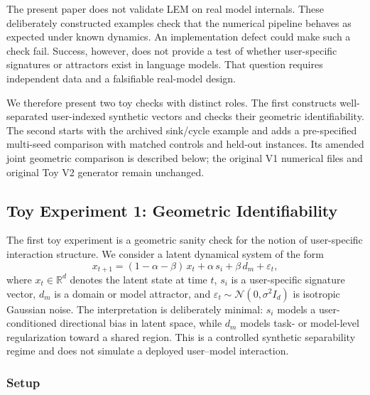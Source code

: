 \documentclass[11pt]{article}
\begin{document}
The present paper does not validate LEM on real model internals. These deliberately
constructed examples check that the numerical pipeline behaves as expected under
known dynamics. An implementation defect could make such a check fail. Success,
however, does not provide a test of whether user-specific signatures or attractors
exist in language models. That question requires independent data and a falsifiable
real-model design.

We therefore present two toy checks with distinct roles. The first constructs
well-separated user-indexed synthetic vectors and checks their geometric
identifiability. The second starts with the archived sink/cycle example and
adds a pre-specified multi-seed comparison with matched controls and held-out
instances. Its amended joint geometric comparison is described below; the
original V1 numerical files and original Toy V2 generator remain unchanged.

\subsection{Toy Experiment 1: Geometric Identifiability}

The first toy experiment is a geometric sanity check for the notion of
user-specific interaction structure. We consider a latent dynamical system of the
form
\begin{equation}
  x_{t+1} = (1 - \alpha - \beta)\, x_t + \alpha\, s_i + \beta\, d_m + \varepsilon_t,
\end{equation}
where $x_t \in \mathbb{R}^d$ denotes the latent state at time $t$, $s_i$ is a
user-specific signature vector, $d_m$ is a domain or model attractor, and
$\varepsilon_t \sim \mathcal{N}(0, \sigma^2 I_d)$ is isotropic Gaussian noise. The
interpretation is deliberately minimal: $s_i$ models a user-conditioned directional
bias in latent space, while $d_m$ models task- or model-level regularization toward
a shared region. This is a controlled synthetic separability regime and does not
simulate a deployed user--model interaction.

\subsubsection{Setup}
\end{document}

